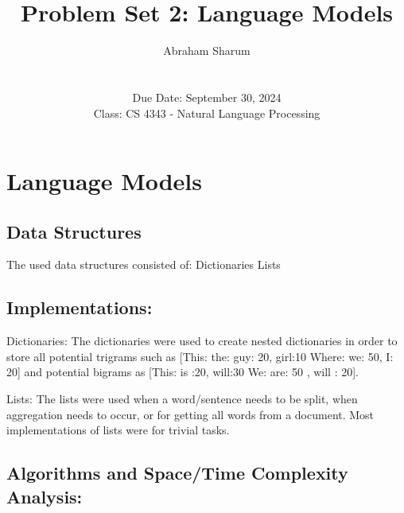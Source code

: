 \documentclass[10pt,titlepage]{article}
\title{Problem Set 2: Language Models}
\author{Abraham Sharum \\\\ \\ Due Date: September 30, 2024 \\ Class: CS 4343 - Natural Language Processing}
\begin{document}
	\pagestyle{fancy}
	\fancyhead{}
	\fancyfoot{}
	\fancyfoot[CE,CO]{\textbf{\thepage}}
	\maketitle
	
	\section*{Language Models}
	\subsection*{Data Structures}
	
	\begin{spverbatim}
		The used data structures consisted of:
		Dictionaries
		Lists
	\end{spverbatim}	
\subsection*{Implementations:}
	\begin{spverbatim}
			Dictionaries: The dictionaries were used to create nested dictionaries in order to store all potential trigrams such as [This: {the: {guy: 20, girl:10}} {Where: {we: 50, I: 20}}] and potential bigrams as [This: {is :20}, {will:30} We: {are: 50} , {will : 20}].
		
			Lists: The lists were used when a word/sentence needs to be split, when aggregation needs to occur, or for getting all words from a document. Most implementations of lists were for trivial tasks.
	\end{spverbatim}	
\subsection*{Algorithms and Space/Time Complexity Analysis:}
\end{document}
